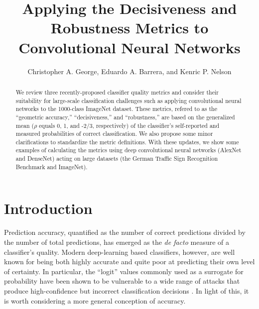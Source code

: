 \documentclass{spie}
\begin{document}
\title{Applying the Decisiveness and Robustness Metrics to Convolutional Neural Networks}
\author{Christopher A. George, Eduardo A. Barrera, and Kenric P. Nelson
\skiplinehalf
{} \\
}

\pagestyle{plain}
\setcounter{page}{1}
\maketitle

\begin{abstract}
We review three recently-proposed classifier quality metrics and consider their suitability for large-scale classification challenges such as applying convolutional neural networks to the 1000-class ImageNet dataset. These metrics, refered to as the ``geometric accuracy,'' ``decisiveness,'' and ``robustness,'' are based on the generalized mean ($\rho$ equals 0, 1, and -2/3, respectively) of the classifier's self-reported and measured probabilities of correct classification. We also propose some minor clarifications to standardize the metric definitions. With these updates, we show some examples of calculating the metrics using deep convolutional neural networks (AlexNet and DenseNet) acting on large datasets (the German Traffic Sign Recognition Benchmark and ImageNet). 
\end{abstract}



\section{Introduction}
\label{sec:introduction}
Prediction accuracy, quantified as the number of correct predictions divided by the number of total predictions, has emerged as the \textit{de facto} measure of a classifier's quality. Modern deep-learning based classifiers, however, are well known for being both highly accurate and quite poor at predicting their own level of certainty. In particular, the ``logit'' values commonly used as a surrogate for probability have been shown to be vulnerable to a wide range of attacks that produce high-confidence but incorrect classification decisions \cite{fooled}. In light of this, it is worth considering a more general conception of accuracy.
\end{document}
